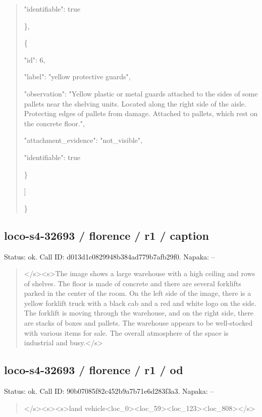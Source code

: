 \documentclass[10pt,a4paper]{article}
\begin{document}
\begin{quote}
      "identifiable":\allowbreak{} true\par
    \},\allowbreak{}\par
    \{\par
      "id":\allowbreak{} 6,\allowbreak{}\par
      "label":\allowbreak{} "yellow protective guards",\allowbreak{}\par
      "observation":\allowbreak{} "Yellow plastic or metal guards attached to the sides of some pallets near the shelving units. Located along the right side of the aisle. Protecting edges of pallets from damage. Attached to pallets,\allowbreak{} which rest on the concrete floor.",\allowbreak{}\par
      "attachment\_evidence":\allowbreak{} "not\_visible",\allowbreak{}\par
      "identifiable":\allowbreak{} true\par
    \}\par
  ]\par
\}
\end{quote}
\subsection*{loco-s4-32693 / florence / r1 / caption}
Status: ok. Call ID: d013d1c0829948b384ad779b7afb29f0. Napaka: --
\begin{quote}\footnotesize
</s>\allowbreak{}<s>\allowbreak{}The image shows a large warehouse with a high ceiling and rows of shelves. The floor is made of concrete and there are several forklifts parked in the center of the room. On the left side of the image,\allowbreak{} there is a yellow forklift truck with a black cab and a red and white logo on the side. The forklift is moving through the warehouse,\allowbreak{} and on the right side,\allowbreak{} there are stacks of boxes and pallets. The warehouse appears to be well-stocked with various items for sale. The overall atmosphere of the space is industrial and busy.</s>\allowbreak{}
\end{quote}
\subsection*{loco-s4-32693 / florence / r1 / od}
Status: ok. Call ID: 90b07085f82c452b9a7b71e6d283f3a3. Napaka: --
\begin{quote}\footnotesize
</s>\allowbreak{}<s>\allowbreak{}<s>\allowbreak{}land vehicle<loc\_0>\allowbreak{}<loc\_59>\allowbreak{}<loc\_123>\allowbreak{}<\allowbreak{}loc\_808>\allowbreak{}</s>\allowbreak{}
\end{quote}
\end{document}
